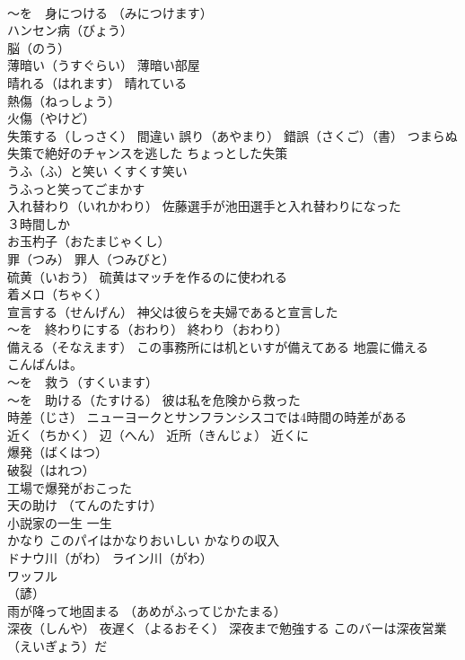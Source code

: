 \documentclass[8pt]{extreport}
\begin{document}
\begin{CJK}{UTF8}{min}
\\	～を　身につける （みにつけます）
\\	ハンセン病（びょう）
\\	脳（のう）
\\	薄暗い（うすぐらい） 薄暗い部屋
\\	晴れる（はれます） 晴れている
\\	熱傷（ねっしょう）
\\	火傷（やけど）
\\	失策する（しっさく） 間違い 誤り（あやまり） 錯誤（さくご）（書） つまらぬ失策で絶好のチャンスを逃した ちょっとした失策
\\	うふ（ふ）と笑い くすくす笑い 
\\	うふっと笑ってごまかす
\\	入れ替わり（いれかわり） 佐藤選手が池田選手と入れ替わりになった
\\	３時間しか
\\	お玉杓子（おたまじゃくし）
\\	罪（つみ） 罪人（つみびと）
\\	硫黄（いおう） 硫黄はマッチを作るのに使われる
\\	着メロ（ちゃく）
\\	宣言する（せんげん） 神父は彼らを夫婦であると宣言した
\\	～を　終わりにする（おわり） 終わり（おわり）
\\	備える（そなえます） この事務所には机といすが備えてある 地震に備える
\\	こんばんは。
\\	～を　救う（すくいます）
\\	～を　助ける（たすける） 彼は私を危険から救った
\\	時差（じさ） ニューヨークとサンフランシスコでは4時間の時差がある
\\	近く（ちかく） 辺（へん） 近所（きんじょ） 近くに
\\	爆発（ばくはつ）
\\	破裂（はれつ）
\\	工場で爆発がおこった
\\	天の助け （てんのたすけ）
\\	小説家の一生 一生
\\	かなり このパイはかなりおいしい かなりの収入
\\	ドナウ川（がわ） ライン川（がわ）
\\	ワッフル
\\	（諺）
\\	雨が降って地固まる （あめがふってじかたまる）
\\	深夜（しんや） 夜遅く（よるおそく） 深夜まで勉強する このバーは深夜営業（えいぎょう）だ

\end{CJK}
\end{document}
